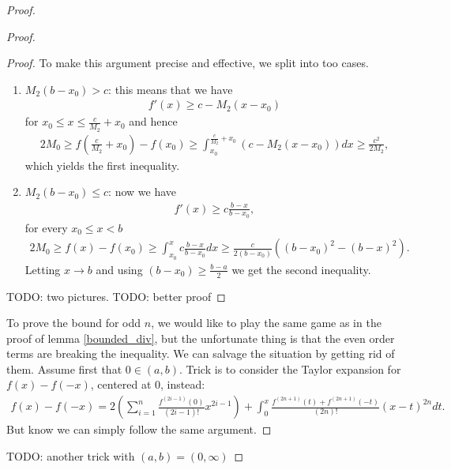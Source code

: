 \begin{proof}
\begin{proof}
\begin{proof}
			To make this argument precise and effective, we split into too cases.

			\begin{enumerate}
				\item $M_{2} (b - x_{0}) > c$: this means that we have
				\begin{align*}
					f'(x) \geq c - M_{2} (x - x_{0})
				\end{align*}
				for $x_{0} \leq x \leq \frac{c}{M_{2}} + x_{0}$ and hence
				\begin{align*}
					2 M_{0} \geq f\left(\frac{c}{M_{2}} + x_{0}\right) - f(x_{0}) \geq \int_{x_{0}}^{\frac{c}{M_{2}} + x_{0}} \left(c - M_{2} (x - x_{0})\right) dx \geq \frac{c^2}{2 M_{2}},
				\end{align*}
				which yields the first inequality.
				\item $M_{2} (b - x_{0}) \leq c$: now we have
				\begin{align*}
					f'(x) \geq c \frac{b - x}{b - x_{0}},
				\end{align*}
				for every $x_{0} \leq x < b$
				\begin{align*}
					2 M_{0} \geq f(x) - f(x_{0}) \geq \int_{x_{0}}^{x}  c \frac{b - x}{b - x_{0}} d x \geq \frac{c}{2(b - x_{0})} \left((b - x_{0})^2 - (b - x)^2\right).
				\end{align*}
				Letting $x \to b$ and using $(b - x_{0}) \geq \frac{b - a}{2}$ we get the second inequality.
			\end{enumerate}

			TODO: two pictures.
			TODO: better proof
		\end{proof}

		To prove the bound for odd $n$, we would like to play the same game as in the proof of lemma \ref{bounded_div}, but the unfortunate thing is that the even order terms are breaking the inequality. We can salvage the situation by getting rid of them. Assume first that $0 \in (a, b)$. Trick is to consider the Taylor expansion for $f(x) - f(-x)$, centered at $0$, instead:
		\begin{align*}
			f(x) - f(-x) = 2 \left(\sum_{i = 1}^{n} \frac{f^{(2 i - 1)}(0)}{(2 i - 1)!}x^{2 i - 1}\right) + \int_{0}^{x} \frac{f^{(2 n + 1)}(t) + f^{(2 n + 1)}(-t)}{(2n)!} (x - t)^{2 n} dt.
		\end{align*}
		But know we can simply follow the same argument.
	\end{proof}

	TODO: another trick with $(a, b) = (0, \infty)$
\end{proof}


